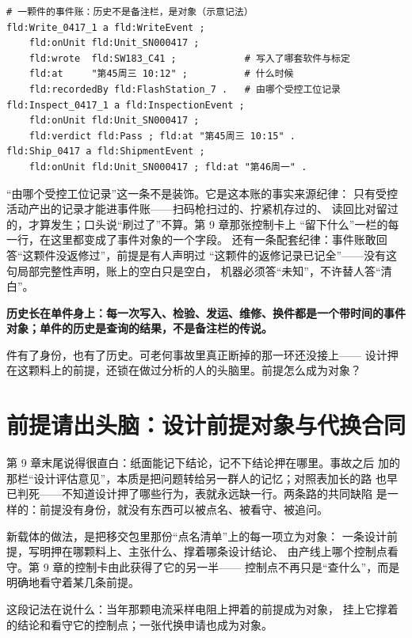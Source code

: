 \nopagebreak[4]
\begin{codebox}
\begin{Verbatim}[fontsize=\small,breaklines=true,breakanywhere=true,breaksymbolleft={},breaksymbolright={}]
# 一颗件的事件账：历史不是备注栏，是对象（示意记法）
fld:Write_0417_1 a fld:WriteEvent ;
    fld:onUnit fld:Unit_SN000417 ;
    fld:wrote  fld:SW183_C41 ;            # 写入了哪套软件与标定
    fld:at     "第45周三 10:12" ;          # 什么时候
    fld:recordedBy fld:FlashStation_7 .   # 由哪个受控工位记录
fld:Inspect_0417_1 a fld:InspectionEvent ;
    fld:onUnit fld:Unit_SN000417 ;
    fld:verdict fld:Pass ; fld:at "第45周三 10:15" .
fld:Ship_0417 a fld:ShipmentEvent ;
    fld:onUnit fld:Unit_SN000417 ; fld:at "第46周一" .
\end{Verbatim}
\end{codebox}

“由哪个受控工位记录”这一条不是装饰。它是这本账的事实来源纪律：
只有受控活动产出的记录才能进事件账——扫码枪扫过的、拧紧机存过的、
读回比对留过的，才算发生；口头说“刷过了”不算。第 9 章那张控制卡上
“留下什么”一栏的每一行，在这里都变成了事件对象的一个字段。
还有一条配套纪律：事件账敢回答“这颗件没返修过”，前提是有人声明过
“这颗件的返修记录已记全”——没有这句局部完整性声明，账上的空白只是空白，
机器必须答“未知”，不许替人答“清白”。

\textbf{历史长在单件身上：每一次写入、检验、发运、维修、换件都是一个带时间的事件对象；单件的历史是查询的结果，不是备注栏的传说。}

件有了身份，也有了历史。可老何事故里真正断掉的那一环还没接上——
设计押在这颗料上的前提，还锁在做过分析的人的头脑里。前提怎么成为对象？

\section{前提请出头脑：设计前提对象与代换合同}

第 9 章末尾说得很直白：纸面能记下结论，记不下结论押在哪里。事故之后
加的那栏“设计评估意见”，本质是把问题转给另一群人的记忆；对照表加长的路
也早已判死——不知道设计押了哪些行为，表就永远缺一行。两条路的共同缺陷
是一样的：前提没有身份，就没有东西可以被点名、被看守、被追问。

新载体的做法，是把移交包里那份“点名清单”上的每一项立为对象：
一条设计前提，写明押在哪颗料上、主张什么、撑着哪条设计结论、
由产线上哪个控制点看守。第 9 章的控制卡由此获得了它的另一半——
控制点不再只是“查什么”，而是明确地看守着某几条前提。

这段记法在说什么：当年那颗电流采样电阻上押着的前提成为对象，
挂上它撑着的结论和看守它的控制点；一张代换申请也成为对象。

